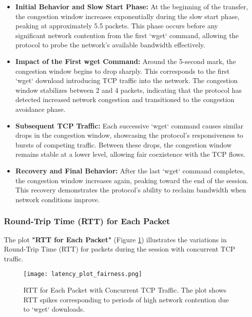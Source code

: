 \documentclass[11pt]{article}
\begin{document}
\begin{itemize}
    \item \textbf{Initial Behavior and Slow Start Phase:} At the beginning of the transfer, the congestion window increases exponentially during the slow start phase, peaking at approximately 5.5 packets. This phase occurs before any significant network contention from the first `wget` command, allowing the protocol to probe the network's available bandwidth effectively.
    
    \item \textbf{Impact of the First wget Command:} Around the 5-second mark, the congestion window begins to drop sharply. This corresponds to the first `wget` download introducing TCP traffic into the network. The congestion window stabilizes between 2 and 4 packets, indicating that the protocol has detected increased network congestion and transitioned to the congestion avoidance phase.
    
    \item \textbf{Subsequent TCP Traffic:} Each successive `wget` command causes similar drops in the congestion window, showcasing the protocol's responsiveness to bursts of competing traffic. Between these drops, the congestion window remains stable at a lower level, allowing fair coexistence with the TCP flows.
    
    \item \textbf{Recovery and Final Behavior:} After the last `wget` command completes, the congestion window increases again, peaking toward the end of the session. This recovery demonstrates the protocol’s ability to reclaim bandwidth when network conditions improve.
\end{itemize}

\subsubsection{Round-Trip Time (RTT) for Each Packet}

The plot \textbf{"RTT for Each Packet"} (Figure \ref{fig:latency_fairness}) illustrates the variations in Round-Trip Time (RTT) for packets during the session with concurrent TCP traffic.

\begin{figure}[H]
    \centering
    \texttt{[image: latency\_plot\_fairness.png]}
    \caption{RTT for Each Packet with Concurrent TCP Traffic. The plot shows RTT spikes corresponding to periods of high network contention due to `wget` downloads.}
    \label{fig:latency_fairness}
\end{figure}
\end{document}
